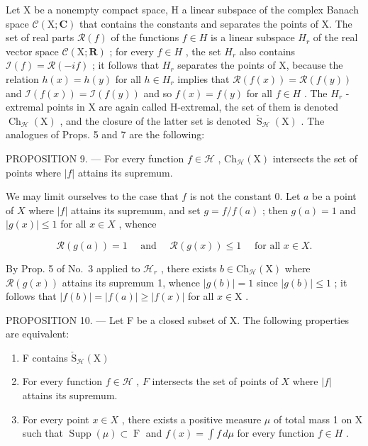 Let X be a nonempty compact space, H a linear subspace of the complex Banach space \(\mathcal{C}(\mathrm{X};\mathbf{C})\) that contains the constants and separates the points of X. The set of real parts \(\mathcal{R}(f)\) of the functions \(f \in H\) is a linear subspace \(H_{r}\) of the real vector space \(\mathcal{C}(\mathrm{X};\mathbf{R})\) ; for every \(f \in H\) , the set \(H_{r}\) also contains \(\mathcal{I}(f) = \mathcal{R}(-if)\) ; it follows that \(H_{r}\) separates the points of X, because the relation \(h(x) = h(y)\) for all \(h \in H_{r}\) implies that \(\mathcal{R}(f(x)) = \mathcal{R}(f(y))\) and \(\mathcal{I}(f(x)) = \mathcal{I}(f(y))\) and so \(f(x) = f(y)\) for all \(f \in H\) . The \(H_{r}\) -extremal points in X are again called H-extremal, the set of them is denoted \(\operatorname{Ch}_{\mathcal{H}}(\mathrm{X})\) , and the closure of the latter set is denoted \(\check{\operatorname{S}}_{\mathcal{H}}(\mathrm{X})\) . The analogues of Props. 5 and 7 are the following:

PROPOSITION 9. --- For every function \(f \in \mathcal{H}\) , \(\mathrm{Ch}_{\mathcal{H}}(\mathrm{X})\) intersects the set of points where \(|f|\) attains its supremum.

We may limit ourselves to the case that \(f\) is not the constant 0. Let \(a\) be a point of \(X\) where \(|f|\) attains its supremum, and set \(g = f / f(a)\) ; then \(g(a) = 1\) and \(|g(x)| \leqslant 1\) for all \(x \in X\) , whence

\[
\mathscr {R} (g (a)) = 1 \quad \text { and } \quad \mathscr {R} (g (x)) \leqslant 1 \quad \text { for   all } x \in X.
\]

By Prop. 5 of No.~3 applied to \(\mathcal{H}_r\) , there exists \(b \in \mathrm{Ch}_{\mathcal{H}}(\mathrm{X})\) where \(\mathcal{R}(g(x))\) attains its supremum 1, whence \(|g(b)| = 1\) since \(|g(b)| \leqslant 1\) ; it follows that \(|f(b)| = |f(a)| \geqslant |f(x)|\) for all \(x \in \mathrm{X}\) .

PROPOSITION 10. --- Let F be a closed subset of X. The following properties are equivalent:

\begin{enumerate}
\def\labelenumi{\alph{enumi})}
\item
  F contains \(\check{\mathrm{S}}_{\mathcal{H}}(\mathrm{X})\)
\item
  For every function \(f \in \mathcal{H}\) , \(F\) intersects the set of points of \(X\) where \(|f|\) attains its supremum.
\item
  For every point \(x \in X\) , there exists a positive measure \(\mu\) of total mass 1 on X such that \(\operatorname{Supp}(\mu) \subset \operatorname{F}\) and \(f(x) = \int f \, d\mu\) for every function \(f \in H\) .
\end{enumerate}

